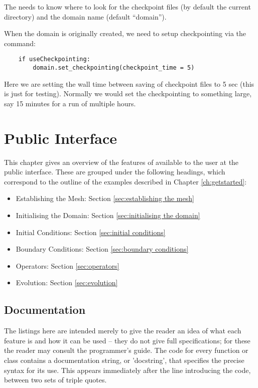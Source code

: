 \documentclass{manual}
\begin{document}
The  needs to know where to look for the checkpoint files (by default the current directory) and the domain name (default ``domain'').

When the domain is originally created, we need to setup checkpointing via the command:
\begin{verbatim}
    if useCheckpointing:
        domain.set_checkpointing(checkpoint_time = 5)
\end{verbatim}

Here we are setting the wall time between saving of checkpoint files to 5 sec (this is just for testing). Normally we would set the checkpointing to something large, say 15 minutes for a run of multiple hours.





\chapter{\anuga Public Interface}
\label{ch:interface}

This chapter gives an overview of the features of \anuga available
to the user at the public interface. These are grouped under the
following headings, which correspond to the outline of the examples
described in Chapter \ref{ch:getstarted}:
\begin{itemize}
    \item Establishing the Mesh: Section \ref{sec:establishing the mesh}
    \item Initialising the Domain: Section \ref{sec:initialising the domain}
    \item Initial Conditions: Section \ref{sec:initial conditions}
    \item Boundary Conditions: Section \ref{sec:boundary conditions}
    \item Operators: Section \ref{sec:operators}
    \item Evolution: Section \ref{sec:evolution}
\end{itemize}

\section{Documentation}

The listings here are intended merely to give the reader an idea of what
each feature is and how it can be used -- they do
not give full specifications; for these the reader
may consult the programmer's guide. The code for every function or class contains
a documentation string, or 'docstring', that specifies the precise
syntax for its use. This appears immediately after the line
introducing the code, between two sets of triple quotes.
\end{document}
